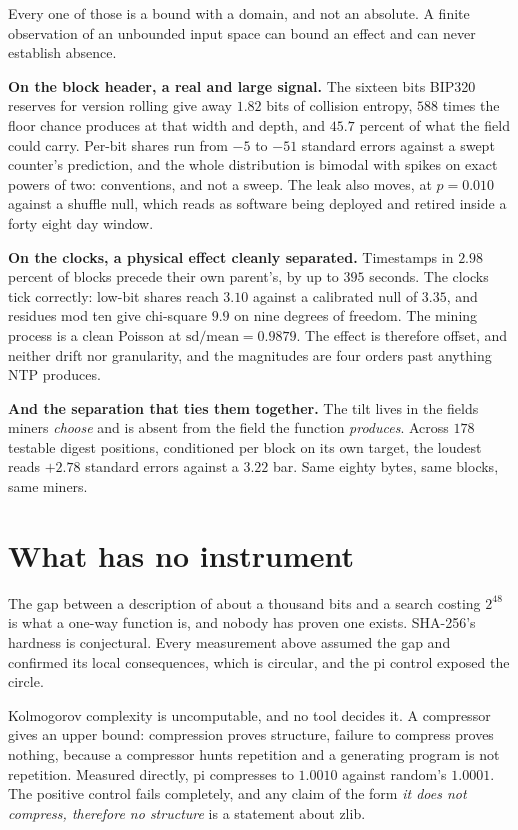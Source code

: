 Every one of those is a bound with a domain, and not an absolute. A finite observation of an unbounded input space can bound an effect and can never establish absence.

\textbf{On the block header, a real and large signal.} The sixteen bits BIP320 reserves for version rolling give away \(1.82\) bits of collision entropy, \(588\) times the floor chance produces at that width and depth, and \(45.7\) percent of what the field could carry. Per-bit shares run from \(-5\) to \(-51\) standard errors against a swept counter's prediction, and the whole distribution is bimodal with spikes on exact powers of two: conventions, and not a sweep. The leak also moves, at \(p = 0.010\) against a shuffle null, which reads as software being deployed and retired inside a forty eight day window.

\textbf{On the clocks, a physical effect cleanly separated.} Timestamps in \(2.98\) percent of blocks precede their own parent's, by up to \(395\) seconds. The clocks tick correctly: low-bit shares reach \(3.10\) against a calibrated null of \(3.35\), and residues mod ten give chi-square \(9.9\) on nine degrees of freedom. The mining process is a clean Poisson at \(\mathrm{sd}/\mathrm{mean} = 0.9879\). The effect is therefore offset, and neither drift nor granularity, and the magnitudes are four orders past anything NTP produces.

\textbf{And the separation that ties them together.} The tilt lives in the fields miners \emph{choose} and is absent from the field the function \emph{produces}. Across \(178\) testable digest positions, conditioned per block on its own target, the loudest reads \(+2.78\) standard errors against a \(3.22\) bar. Same eighty bytes, same blocks, same miners.

\section{What has no instrument}

The gap between a description of about a thousand bits and a search costing \(2^{48}\) is what a one-way function is, and nobody has proven one exists. SHA-256's hardness is conjectural. Every measurement above assumed the gap and confirmed its local consequences, which is circular, and the pi control exposed the circle.

Kolmogorov complexity is uncomputable, and no tool decides it. A compressor gives an upper bound: compression proves structure, failure to compress proves nothing, because a compressor hunts repetition and a generating program is not repetition. Measured directly, pi compresses to \(1.0010\) against random's \(1.0001\). The positive control fails completely, and any claim of the form \emph{it does not compress, therefore no structure} is a statement about zlib.

